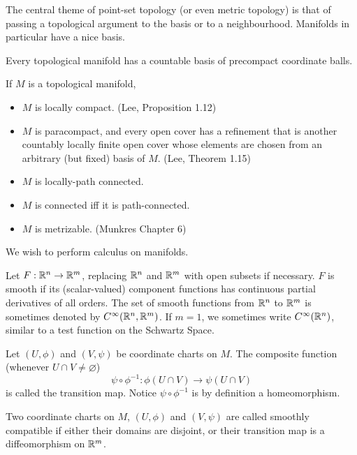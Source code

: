 \documentclass[../main-manifolds.tex]{subfiles}
\begin{document}
The central theme of point-set topology (or even metric topology) is that of passing a topological argument to the basis or to a neighbourhood. Manifolds in particular have a nice basis.
\begin{wts}
    Every topological manifold has a countable basis of precompact coordinate balls.
\end{wts}
\begin{wts}
If $M$ is a topological manifold, 
\begin{itemize}
    \item $M$ is locally compact. (Lee, Proposition 1.12)
    \item $M$ is paracompact, and every open cover has a refinement 
    that is another countably locally finite open cover whose elements are chosen from an arbitrary (but fixed) basis of $M$. (Lee, Theorem 1.15)
    \item $M$ is locally-path connected.
    \item $M$ is connected iff it is path-connected.
    \item $M$ is metrizable. (Munkres Chapter 6)
\end{itemize}
\end{wts}

We wish to perform calculus on manifolds.
\begin{definition}\label{lee-chp1:real-smooth-function}
    Let $F:{\mathbb{R}^n}\to{\mathbb{R}^m}$, replacing ${\mathbb{R}^n}$ and ${\mathbb{R}^m}$ with open subsets if necessary. $F$ is smooth if its (scalar-valued) component functions has continuous partial derivatives of all orders. The set of smooth functions from ${\mathbb{R}^n}$ to ${\mathbb{R}^m}$ is sometimes denoted by $\cinf[\realn,\realm]$. If $m=1$, we sometimes write $\cinf[\realn]$, similar to a test function on the Schwartz Space.
\end{definition}

\begin{definition}\label{lee-chp1:transition-maps}
    Let $(U,\phi)$ and $(V,\psi)$ be coordinate charts on $M$. The composite function (whenever $U\cap V\neq\varnothing$) 
    \[
    \psi\circ\phi^{-1}:\phi(U\cap V)\to\psi(U\cap V)
    \] 
    is called the transition map. Notice $\psi\circ\phi^{-1}$ is by definition a homeomorphism.
\end{definition}

\begin{definition}\label{lee-chp1:smoothly-compatible}
    Two coordinate charts on $M$, $(U,\phi)$ and $(V,\psi)$ are called smoothly compatible if either their domains are disjoint, or their transition map is a diffeomorphism on ${\mathbb{R}^m}$.
\end{definition}
\end{document}
